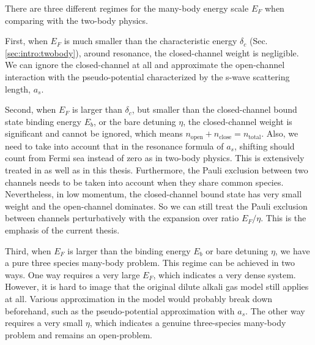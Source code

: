 There are three different regimes for the many-body energy scale $E_F$ when comparing with the two-body physics.  

First, when $E_F$ is much smaller than the characteristic energy $\delta_c$ (Sec. \ref{sec:intro:twobody}), around resonance, the closed-channel weight is negligible. We can ignore the closed-channel at all and approximate the open-channel interaction with the pseudo-potential characterized by the s-wave scattering length, $a_s$. 

Second, when $E_F$ is larger than $\delta_c$, but smaller than the closed-channel bound state binding energy $E_b$, or the bare detuning $\eta$, the closed-channel weight is significant and cannot be ignored, which means $n_{\text{open}}+n_{\text{close}}=n_{\text{total}}$. Also, we need to take into account that in the resonance formula of $a_s$, shifting should count from Fermi sea instead of zero as in two-body physics.    This is extensively treated in \cite{GurarieNarrow} as well as in this thesis.  Furthermore, the Pauli exclusion between two channels needs to be taken into account when they share common species.  Nevertheless, in  low momentum, the closed-channel bound state has very small weight and the open-channel dominates.  So we can still treat the Pauli exclusion between channels perturbatively with the expansion over ratio $E_F/\eta$.  This is the emphasis of the current thesis.  

Third, when $E_F$ is larger than the binding energy $E_b$ or bare detuning $\eta$, we have a pure three species many-body problem. This regime can be achieved in two ways.  One way requires a very large $E_F$, which indicates a very dense system.  However, it is hard to image that  the original dilute alkali gas model still applies at all. Various approximation in the model would probably break down beforehand, such as the pseudo-potential approximation with $a_s$. The other way requires a very small $\eta$, which indicates a genuine three-species many-body problem and remains an open-problem.   

